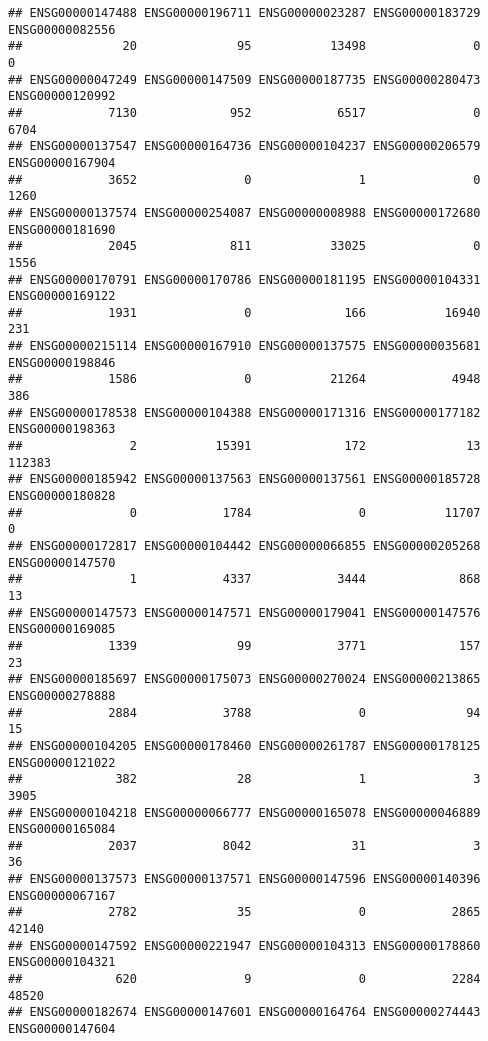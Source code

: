 \documentclass[
]{article}
\begin{document}
\begin{verbatim}
## ENSG00000147488 ENSG00000196711 ENSG00000023287 ENSG00000183729 ENSG00000082556 
##              20              95           13498               0               0 
## ENSG00000047249 ENSG00000147509 ENSG00000187735 ENSG00000280473 ENSG00000120992 
##            7130             952            6517               0            6704 
## ENSG00000137547 ENSG00000164736 ENSG00000104237 ENSG00000206579 ENSG00000167904 
##            3652               0               1               0            1260 
## ENSG00000137574 ENSG00000254087 ENSG00000008988 ENSG00000172680 ENSG00000181690 
##            2045             811           33025               0            1556 
## ENSG00000170791 ENSG00000170786 ENSG00000181195 ENSG00000104331 ENSG00000169122 
##            1931               0             166           16940             231 
## ENSG00000215114 ENSG00000167910 ENSG00000137575 ENSG00000035681 ENSG00000198846 
##            1586               0           21264            4948             386 
## ENSG00000178538 ENSG00000104388 ENSG00000171316 ENSG00000177182 ENSG00000198363 
##               2           15391             172              13          112383 
## ENSG00000185942 ENSG00000137563 ENSG00000137561 ENSG00000185728 ENSG00000180828 
##               0            1784               0           11707               0 
## ENSG00000172817 ENSG00000104442 ENSG00000066855 ENSG00000205268 ENSG00000147570 
##               1            4337            3444             868              13 
## ENSG00000147573 ENSG00000147571 ENSG00000179041 ENSG00000147576 ENSG00000169085 
##            1339              99            3771             157              23 
## ENSG00000185697 ENSG00000175073 ENSG00000270024 ENSG00000213865 ENSG00000278888 
##            2884            3788               0              94              15 
## ENSG00000104205 ENSG00000178460 ENSG00000261787 ENSG00000178125 ENSG00000121022 
##             382              28               1               3            3905 
## ENSG00000104218 ENSG00000066777 ENSG00000165078 ENSG00000046889 ENSG00000165084 
##            2037            8042              31               3              36 
## ENSG00000137573 ENSG00000137571 ENSG00000147596 ENSG00000140396 ENSG00000067167 
##            2782              35               0            2865           42140 
## ENSG00000147592 ENSG00000221947 ENSG00000104313 ENSG00000178860 ENSG00000104321 
##             620               9               0            2284           48520 
## ENSG00000182674 ENSG00000147601 ENSG00000164764 ENSG00000274443 ENSG00000147604 

\end{verbatim}
\end{document}
